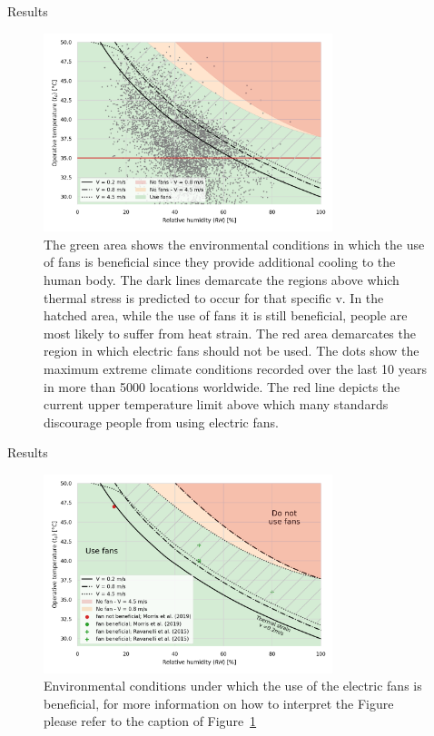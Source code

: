 \documentclass[aspectratio=169]{beamer}
\begin{document}
    \begin{frame}{Results}
        \begin{figure}[thb!]
            \centering
            \includegraphics[width=0.75\textwidth]{figures/use_fans}
            \caption{The green area shows the environmental conditions in which the use of fans is beneficial since they provide additional cooling to the human body.
            The dark lines demarcate the regions above which thermal stress is predicted to occur for that specific \ac{v}.
            In the hatched area, while the use of fans it is still beneficial, people are most likely to suffer from heat strain.
            The red area demarcates the region in which electric fans should not be used.
            The dots show the maximum extreme climate conditions recorded over the last 10 years in more than 5000 locations worldwide.
            The red line depicts the current upper temperature limit above which many standards discourage people from using electric fans.}
            \label{fig:energy_storage_delta}
        \end{figure}
    \end{frame}

    \begin{frame}{Results}
        \begin{figure}[thb!]
            \centering
            \includegraphics[width=0.75\textwidth]{figures/summary_use_fans_comparison_experimental}
            \caption{Environmental conditions under which the use of the electric fans is beneficial, for more information on how to interpret the Figure please refer to the caption of Figure~\ref{fig:energy_storage_delta}
            }
            \label{fig:use_fans_experimental}
        \end{figure}
    \end{frame}
\end{document}
